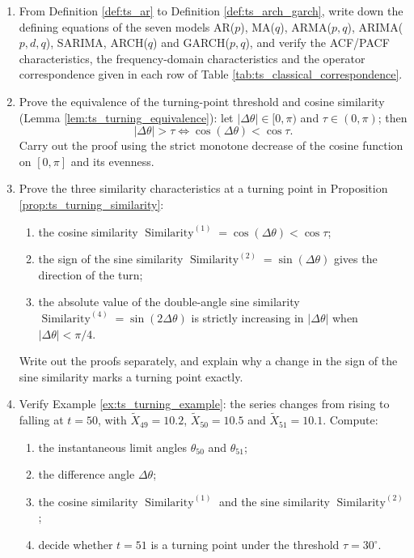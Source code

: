 \begin{enumerate}[leftmargin=3em, label=\textbf{Exercise \arabic*}]
    \item From Definition \ref{def:ts_ar} to Definition \ref{def:ts_arch_garch},
    write down the defining equations of the seven models
    AR($p$), MA($q$), ARMA($p,q$), ARIMA($p,d,q$),
    SARIMA, ARCH($q$) and GARCH($p,q$),
    and verify the ACF/PACF characteristics, the frequency-domain characteristics
    and the operator correspondence given in each row of Table \ref{tab:ts_classical_correspondence}.

    \item Prove the equivalence of the turning-point threshold and cosine similarity (Lemma \ref{lem:ts_turning_equivalence}):
    let $|\Delta\theta|\in[0,\pi)$ and $\tau\in(0,\pi)$; then
    \[
    |\Delta\theta|>\tau\Longleftrightarrow\cos(\Delta\theta)<\cos\tau.
    \]
    Carry out the proof using the strict monotone decrease of the cosine function on $[0,\pi]$ and its evenness.

    \item Prove the three similarity characteristics at a turning point in Proposition \ref{prop:ts_turning_similarity}:
    \begin{enumerate}[label=(\roman*)]
        \item the cosine similarity $\operatorname{Similarity}^{(1)}=\cos(\Delta\theta)<\cos\tau$;
        \item the sign of the sine similarity $\operatorname{Similarity}^{(2)}=\sin(\Delta\theta)$ gives the direction of the turn;
        \item the absolute value of the double-angle sine similarity $\operatorname{Similarity}^{(4)}=\sin(2\Delta\theta)$
              is strictly increasing in $|\Delta\theta|$ when $|\Delta\theta|<\pi/4$.
    \end{enumerate}
    Write out the proofs separately, and explain why a change in the sign of the sine similarity marks a turning point exactly.

    \item Verify Example \ref{ex:ts_turning_example}:
    the series changes from rising to falling at $t=50$,
    with $\tilde{X}_{49}=10.2$, $\tilde{X}_{50}=10.5$ and $\tilde{X}_{51}=10.1$.
    Compute:
    \begin{enumerate}[label=(\roman*)]
        \item the instantaneous limit angles $\theta_{50}$ and $\theta_{51}$;
        \item the difference angle $\Delta\theta$;
        \item the cosine similarity $\operatorname{Similarity}^{(1)}$ and the sine similarity $\operatorname{Similarity}^{(2)}$;
        \item decide whether $t=51$ is a turning point under the threshold $\tau=30^\circ$.
    \end{enumerate}


\end{enumerate}
